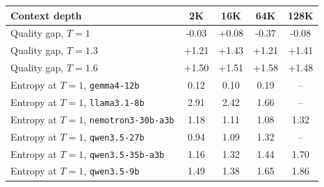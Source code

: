 \begin{tabular}{lcccc}
\toprule
Context depth & 2K & 16K & 64K & 128K \\
\midrule
Quality gap, $T{=}1$ & -0.03 & +0.08 & -0.37 & -0.08 \\
Quality gap, $T{=}1.3$ & +1.21 & +1.43 & +1.21 & +1.41 \\
Quality gap, $T{=}1.6$ & +1.50 & +1.51 & +1.58 & +1.48 \\
\midrule
Entropy at $T{=}1$, \texttt{gemma4-12b} & 0.12 & 0.10 & 0.19 & -- \\
Entropy at $T{=}1$, \texttt{llama3.1-8b} & 2.91 & 2.42 & 1.66 & -- \\
Entropy at $T{=}1$, \texttt{nemotron3-30b-a3b} & 1.18 & 1.11 & 1.08 & 1.32 \\
Entropy at $T{=}1$, \texttt{qwen3.5-27b} & 0.94 & 1.09 & 1.32 & -- \\
Entropy at $T{=}1$, \texttt{qwen3.5-35b-a3b} & 1.16 & 1.32 & 1.44 & 1.70 \\
Entropy at $T{=}1$, \texttt{qwen3.5-9b} & 1.49 & 1.38 & 1.65 & 1.86 \\
\bottomrule
\end{tabular}
